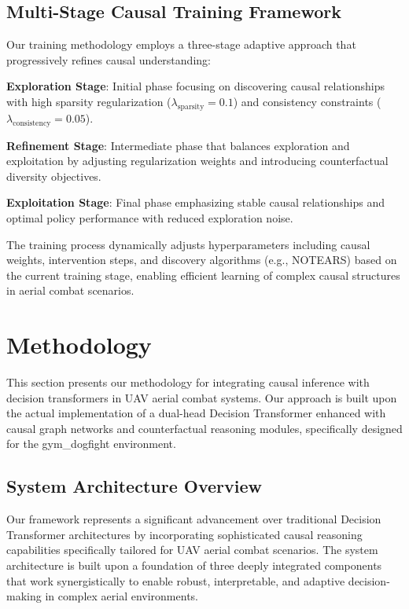 \documentclass[12pt]{article}
\begin{document}
\subsection{Multi-Stage Causal Training Framework}

Our training methodology employs a three-stage adaptive approach that progressively refines causal understanding:

\textbf{Exploration Stage}: Initial phase focusing on discovering causal relationships with high sparsity regularization ($\lambda_{\text{sparsity}} = 0.1$) and consistency constraints ($\lambda_{\text{consistency}} = 0.05$).

\textbf{Refinement Stage}: Intermediate phase that balances exploration and exploitation by adjusting regularization weights and introducing counterfactual diversity objectives.

\textbf{Exploitation Stage}: Final phase emphasizing stable causal relationships and optimal policy performance with reduced exploration noise.

The training process dynamically adjusts hyperparameters including causal weights, intervention steps, and discovery algorithms (e.g., NOTEARS) based on the current training stage, enabling efficient learning of complex causal structures in aerial combat scenarios.

\section{Methodology}

This section presents our methodology for integrating causal inference with decision transformers in UAV aerial combat systems. Our approach is built upon the actual implementation of a dual-head Decision Transformer enhanced with causal graph networks and counterfactual reasoning modules, specifically designed for the gym\_dogfight environment.

\subsection{System Architecture Overview}

Our framework represents a significant advancement over traditional Decision Transformer architectures by incorporating sophisticated causal reasoning capabilities specifically tailored for UAV aerial combat scenarios. The system architecture is built upon a foundation of three deeply integrated components that work synergistically to enable robust, interpretable, and adaptive decision-making in complex aerial environments.
\end{document}
